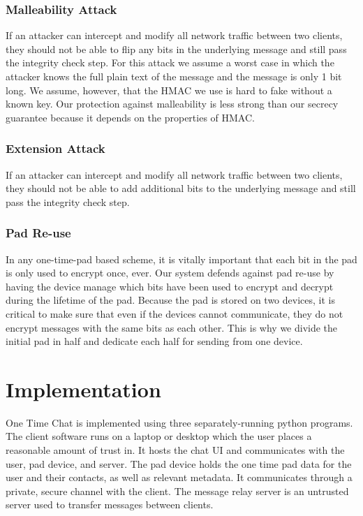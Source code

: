\documentclass[twocolumn]{article}
\begin{document}
\subsubsection{Malleability Attack}
If an attacker can intercept and modify all network traffic between two clients, they should not be able to flip any bits in the underlying message and still pass the integrity check step.
For this attack we assume a worst case in which the attacker knows the full plain text of the message and the message is only 1 bit long.
We assume, however, that the HMAC we use is hard to fake without a known key.
Our protection against malleability is less strong than our secrecy guarantee because it depends on the properties of HMAC.

\subsubsection{Extension Attack}
If an attacker can intercept and modify all network traffic between two clients, they should not be able to add additional bits to the underlying message and still pass the integrity check step.

\subsubsection{Pad Re-use}
In any one-time-pad based scheme, it is vitally important that each bit in the pad is only used to encrypt once, ever.
Our system defends against pad re-use by having the device manage which bits have been used to encrypt and decrypt during the lifetime of the pad.
Because the pad is stored on two devices, it is critical to make sure that even if the devices cannot communicate, they do not encrypt messages with the same bits as each other. This is why we divide the initial pad in half and dedicate each half for sending from one device.


\section{Implementation}
One Time Chat is implemented using three separately-running python programs.
The client software runs on a laptop or desktop which the user places a reasonable amount of trust in. It hosts the chat UI and communicates with the user, pad device, and server.
The pad device holds the one time pad data for the user and their contacts, as well as relevant metadata. It communicates through a private, secure channel with the client.
The message relay server is an untrusted server used to transfer messages between clients.
\end{document}
